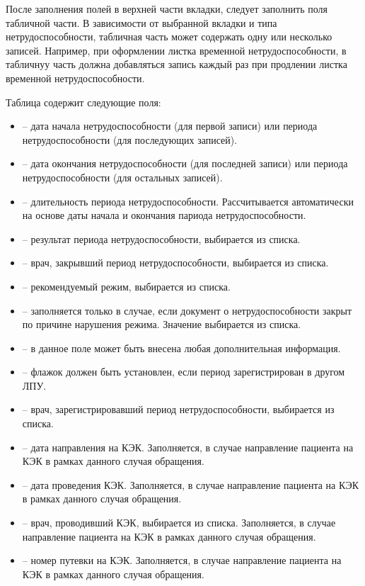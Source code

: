 После заполнения полей в верхней части вкладки, следует заполнить поля табличной части. В зависимости от выбранной вкладки и типа нетрудоспособности, табличная часть может содержать одну или несколько записей. Например, при оформлении листка временной нетрудоспособности, в табличнуу часть должна добавляться запись каждый раз при продлении листка временной нетрудоспособности.

Таблица содержит следующие поля:
\begin{itemize}
 \item {} -- дата начала нетрудоспособности (для первой записи) или периода нетрудоспособности (для последующих записей).
 \item {} -- дата окончания нетрудоспособности (для последней записи) или периода нетрудоспособности (для остальных записей).
 \item {} -- длительность периода нетрудоспособности. Рассчитывается автоматически на основе даты начала и окончания париода нетрудоспособности.
 \item {} -- результат периода нетрудоспособности, выбирается из списка.
 \item {} -- врач, закрывший период нетрудоспособности, выбирается из списка.
 \item {} -- рекомендуемый режим, выбирается из списка.
 \item {} -- заполняется только в случае, если документ о нетрудоспособности закрыт по причине нарушения режима. Значение выбирается из списка.
 \item {} -- в данное поле может быть внесена любая дополнительная информация.
 \item {} -- флажок должен быть установлен, если период зарегистрирован в другом ЛПУ.
 \item {} -- врач, зарегистрировавший период нетрудоспособности, выбирается из списка.
 \item {} -- дата направления на КЭК. Заполняется, в случае направление пациента на КЭК в рамках данного случая обращения.
 \item {} -- дата проведения КЭК. Заполняется, в случае направление пациента на КЭК в рамках данного случая обращения.
 \item {} -- врач, проводивший КЭК, выбирается из списка. Заполняется, в случае направление пациента на КЭК в рамках данного случая обращения.
 \item {} -- номер путевки на КЭК. Заполняется, в случае направление пациента на КЭК в рамках данного случая обращения.

\end{itemize}
